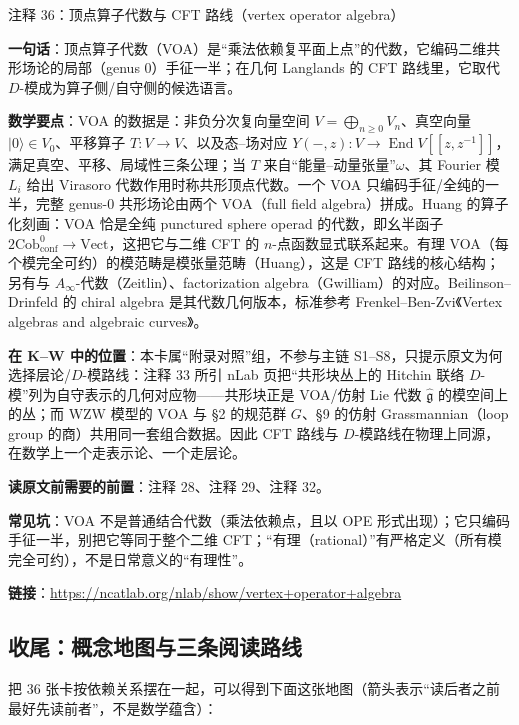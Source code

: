\begin{kcard}{注释 36：顶点算子代数与 CFT 路线（vertex operator algebra）}

\textbf{一句话}：顶点算子代数（VOA）是“乘法依赖复平面上点”的代数，它编码二维共形场论的局部（genus 0）手征一半；在几何 Langlands 的 CFT 路线里，它取代 $D$-模成为算子侧/自守侧的候选语言。

\textbf{数学要点}：VOA 的数据是：非负分次复向量空间 $V=\bigoplus_{n\ge0}V_n$、真空向量 $|0\rangle\in V_0$、平移算子 $T:V\to V$、以及态--场对应 $Y(-,z):V\to\operatorname{End}V[[z,z^{-1}]]$，满足真空、平移、局域性三条公理；当 $T$ 来自“能量--动量张量”$\omega$、其 Fourier 模 $L_i$ 给出 Virasoro 代数作用时称共形顶点代数。一个 VOA 只编码手征/全纯的一半，完整 genus-0 共形场论由两个 VOA（full field algebra）拼成。Huang 的算子化刻画：VOA 恰是全纯 punctured sphere operad 的代数，即幺半函子 $2\mathrm{Cob}^0_{\mathrm{conf}}\to\mathrm{Vect}$，这把它与二维 CFT 的 $n$-点函数显式联系起来。有理 VOA（每个模完全可约）的模范畴是模张量范畴（Huang），这是 CFT 路线的核心结构；另有与 $A_\infty$-代数（Zeitlin）、factorization algebra（Gwilliam）的对应。Beilinson--Drinfeld 的 chiral algebra 是其代数几何版本，标准参考 Frenkel--Ben-Zvi《Vertex algebras and algebraic curves》。

\textbf{在 K--W 中的位置}：本卡属“附录对照”组，不参与主链 S1--S8，只提示原文为何选择层论/$D$-模路线：注释 33 所引 nLab 页把“共形块丛上的 Hitchin 联络 $D$-模”列为自守表示的几何对应物——共形块正是 VOA/仿射 Lie 代数 $\hat{\mathfrak g}$ 的模空间上的丛；而 WZW 模型的 VOA 与 §2 的规范群 $G$、§9 的仿射 Grassmannian（loop group 的商）共用同一套组合数据。因此 CFT 路线与 $D$-模路线在物理上同源，在数学上一个走表示论、一个走层论。

\textbf{读原文前需要的前置}：注释 28、注释 29、注释 32。

\textbf{常见坑}：VOA 不是普通结合代数（乘法依赖点，且以 OPE 形式出现）；它只编码手征一半，别把它等同于整个二维 CFT；“有理（rational）”有严格定义（所有模完全可约），不是日常意义的“有理性”。

\noindent\textbf{链接}：\url{https://ncatlab.org/nlab/show/vertex+operator+algebra}
\end{kcard}

\subsection*{收尾：概念地图与三条阅读路线}

把 36 张卡按依赖关系摆在一起，可以得到下面这张地图（箭头表示“读后者之前最好先读前者”，不是数学蕴含）：

